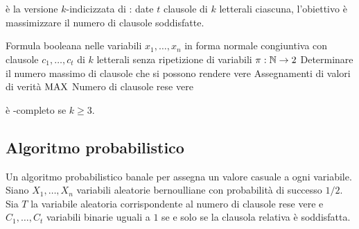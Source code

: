 \section{\MaxEkSat}
\MaxEkSat è la versione $k$-indicizzata di \MaxSat: date $t$ clausole
di $k$ letterali ciascuna, l'obiettivo è massimizzare il numero di clausole
soddisfatte.

\popt
{\MaxEkSat}
{Formula booleana nelle variabili $x_1,\dots,x_n$ in forma normale congiuntiva con clausole $c_1,\dots,c_t$ di $k$ letterali senza ripetizione di variabili}
{$\pi:\mathbb N\to 2$}
{Determinare il numero massimo di clausole che si possono rendere vere}
{Assegnamenti di valori di verità}
{$\mathrm{MAX}$}
{Numero di clausole rese vere}

\MaxEkSat è \NPO-completo se $k\geq3$.


\subsection{Algoritmo probabilistico}
Un algoritmo probabilistico banale per \MaxEkSat assegna un valore casuale a ogni variabile.
Siano $X_1,\dots,X_n$ variabili aleatorie bernoulliane con probabilità di successo $1/2$.
Sia $T$ la variabile aleatoria corrispondente al numero di clausole rese vere e $C_1,\dots,C_t$ variabili binarie uguali a $1$ se e solo se la clausola relativa è soddisfatta.

